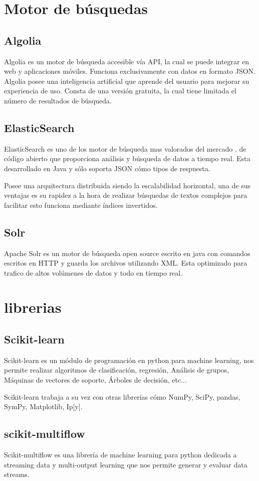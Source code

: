 \section{Motor de búsquedas}

\subsection{Algolia}
Algolia es un motor de búsqueda accesible vía API, la cual se puede integrar en web y aplicaciones móviles. Funciona exclusivamente con datos en formato JSON. Algolia posee una inteligencia artificial que aprende del usuario para mejorar su experiencia de uso. Consta de una versión gratuita, la cual tiene limitada el número de resultados de búsqueda.\cite{pagina:Algolia}

\subsection{ElasticSearch}
ElasticSearch es uno de los motor de búsqueda mas valorados del mercado\cite{ranking:DB-Engines} , de código abierto que proporciona análisis y búsqueda de datos a tiempo real. Esta desarrollado en Java y sólo soporta JSON cómo tipos de respuesta.

Posee una arquitectura distribuida siendo la escalabilidad horizontal, una de sus ventajas es su rapidez a la hora de realizar búsquedas de textos complejos para facilitar esto funciona mediante índices invertidos.\cite{pagina:ElasticSearch}  


\subsection{Solr}
Apache Solr es un motor de búsqueda open source escrito en java con comandos escritos en HTTP y guarda los archivos utilizando XML. Esta optimizado para trafico de altos volúmenes de datos y todo en tiempo real.\cite{pagina:Solr} 

\section{librerias}

\subsection{Scikit-learn}

Scikit-learn es un módulo de programación en python para machine learning, nos permite realizar algoritmos de clasificación, regresión, Análisis de grupos, Máquinas de vectores de soporte, Árboles de decisión, etc...

Scikit-learn trabaja a su vez con otras librerías cómo NumPy, SciPy, pandas, SymPy, Matplotlib, Ip[y].\cite{pagina:scikit-learn}

\subsection{scikit-multiflow}

Scikit-multiflow es una librería de machine learning para python dedicada a streaming data y multi-output learning que nos permite generar y evaluar data streams.\cite{pagina:scikit-mutliflow}
